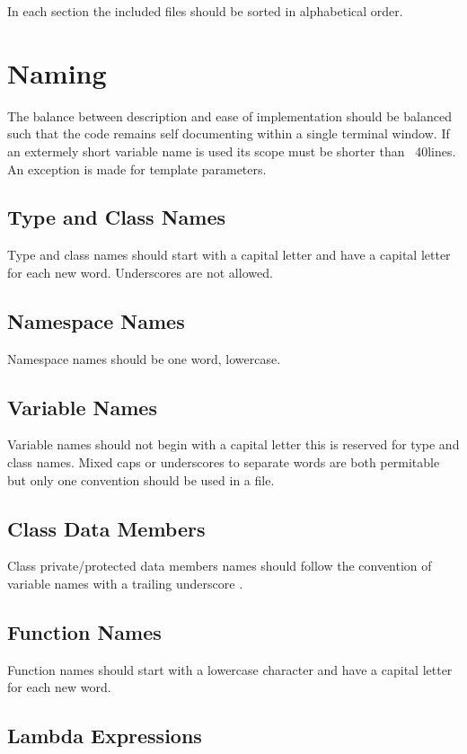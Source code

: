 In each section the included files should be sorted in alphabetical order.

\section{Naming}
The balance between description and ease of implementation should be balanced such that the code remains self documenting within a single terminal window.  If an extermely short variable name is used its scope must be shorter than ~40lines. An exception is made for template parameters.

\subsection{Type and Class Names}

Type and class names should start with a capital letter and have a capital letter for each new word.
Underscores \inlinecode{_} are not allowed. 
\subsection{Namespace Names}

Namespace names should be one word, lowercase.

\subsection{Variable Names}

Variable names should not begin with a capital letter this is reserved for type and class names. Mixed caps or underscores to separate words are both permitable but only one convention should be used in a file.

\subsection{Class Data Members}

Class private/protected data members names should follow the convention of variable names with a trailing underscore \inlinecode{_}.

\subsection{Function Names}

Function names should start with a lowercase character and have a capital letter for each new word.

\subsection{Lambda Expressions}

